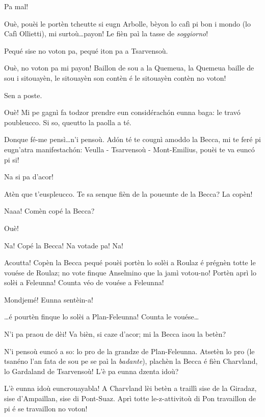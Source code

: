 \begin{drama}
\Ronnyspeaks Pa mal!

\Laurentspeaks Ouè, pouèi le portèn tcheutte si eugn Arbolle, bèyon lo cafì pi bon i mondo (lo Cafì Ollietti), mi surtoù\ldots payon! Le fièn paì la tasse de \textit{soggiorno}!

\Ronnyspeaks Pequé sise no voton pa, pequé iton pa a Tsarvensoù.

\Laurentspeaks Ouè, no voton pa mi payon! Baillon de sou a la Quemeua, la Quemeua baille de sou i sitouayèn, le sitouayèn son contèn é le sitouayèn contèn no voton!

\Ronnyspeaks Sen a poste.

\Laurentspeaks Ouè! Mi pe gagnì fa todzor prendre eun considérach\'on eunna baga: le trav\'o poubleucco. Si so, queutto la paolla a té.

\Ronnyspeaks Donque fé-me pensì\ldots n'i pensoù. Ad\'on té te cougnì amoddo la Becca, mi te feré pi eugn'atra manifestach\'on: Veulla - Tsarvensoù - Mont-Emilius, pouèi te va euncó pi si!

\Laurentspeaks Na si pa d'acor!

\Ronnyspeaks Atèn que t'euspleucco. Te sa senque fièn de la poueunte de la Becca?  La copèn!

\Laurentspeaks Naaa! Comèn copé la Becca?

\Ronnyspeaks Ouè!

\Laurentspeaks {} Na! Copé la Becca! Na votade pa! Na!

\Ronnyspeaks Acoutta! Copèn la Becca pequé pouèi portèn lo solèi a Roulaz é prégnèn totte le vouése de Roulaz; no vote finque Anselmino que la jamì votou-no! Portèn aprì lo solèi a Feleunna! Counta véo de vouése a Feleunna!

\Laurentspeaks Mondjemé! Eunna sentèin-a!

\Ronnyspeaks \ldots é pourtèn finque lo solèi a Plan-Feleunna! Counta le vouése\ldots

\Laurentspeaks N'i pa praou de dèi! Va bièn, si caze d'acor; mi la Becca iaou la betèn?

\Ronnyspeaks N'i pensoù euncó a so: lo pro de la grandze de Plan-Feleunna. Atsetèn lo pro (le tsanéno l'an fata de sou pe se paì la \textit{badante}), plachèn la Becca é fièn Charvland, lo Gardaland de Tsarvensoù! L'è pa eunna dzenta idoù?

\Laurentspeaks L'è eunna idoù euncrouayabla! A Charvland lèi betèn a traillì sise de la Giradaz, sise d'Ampaillan, sise di Pont-Suaz. Aprì totte le-z-attivitoù di Pon travaillon de pi é se travaillon no voton!


\end{drama}

